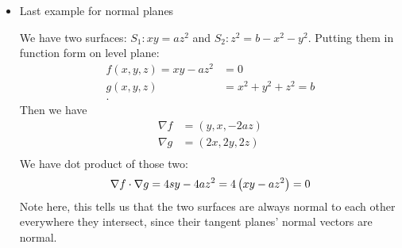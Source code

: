 
\begin{itemize}
	\item Last example for normal planes
		\begin{example}
			We have two surfaces: $S_1: xy = az^2$ and $S_2: z^2 = b-x^2-y^2$. Putting them in function form on level plane:
			\begin{align*}
				f\left( x,y,z \right)  = xy-az^2 &= 0\\
				g\left( x,y,z \right)  &=  x^2 + y^2 + z^2 = b \\
			.\end{align*}
			Then we have
			\begin{align*}
				\nabla f &= \left( y, x, -2az \right) \\
				\nabla g &=  \left( 2x,2y,2z \right)  \\	
			\end{align*}
			We have dot product of those two:
			\begin{equation}
				\nabla f \cdot  \nabla g = 4sy - 4az^2 = 4\left( xy-az^2 \right)  = 0 \\
			\end{equation}
			Note here, this tells us that the two surfaces are always normal to each other everywhere they intersect, since their tangent planes' normal vectors are normal.
		\end{example}

\end{itemize}
